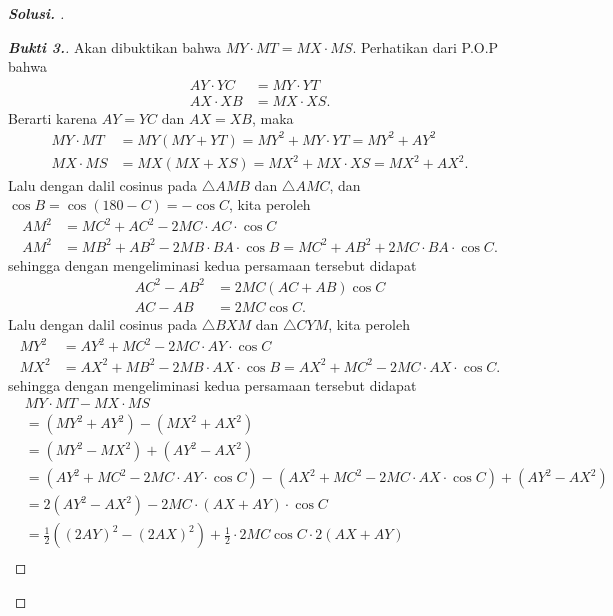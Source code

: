 \begin{proof}[\textbf{Solusi. }]
\begin{proof}[\textbf{Bukti 3.}]
        Akan dibuktikan bahwa $MY \cdot MT = MX \cdot MS$. Perhatikan dari P.O.P bahwa
        \begin{align*}
            AY \cdot YC &= MY \cdot YT\\
            AX \cdot XB &= MX \cdot XS.
        \end{align*}
        Berarti karena $AY=YC$ dan $AX=XB$, maka 
        \begin{align*}
            MY \cdot MT &= MY(MY+YT) = MY^2 + MY \cdot YT = MY^2 + AY^2\\
            MX \cdot MS &= MX(MX+XS) = MX^2 + MX \cdot XS = MX^2 + AX^2.
        \end{align*}
        Lalu dengan dalil cosinus pada $\triangle AMB$ dan $\triangle AMC$, dan $\cos B = \cos(180- C) = -\cos C$, kita peroleh
        \begin{align*}
            AM^2 &= MC^2 + AC^2 - 2MC \cdot AC \cdot \cos C\\
            AM^2 &= MB^2 + AB^2 - 2MB \cdot BA \cdot \cos B = MC^2 + AB^2 + 2MC \cdot BA \cdot \cos C.
        \end{align*}
        sehingga dengan mengeliminasi kedua persamaan tersebut didapat
        \begin{align*}
            AC^2 - AB^2 &= 2MC (AC+AB) \cos C\\
            AC - AB &= 2MC \cos C.
        \end{align*}
        Lalu dengan dalil cosinus pada $\triangle BXM$ dan $\triangle CYM$, kita peroleh
        \begin{align*}
            MY^2 &= AY^2 + MC^2 - 2MC \cdot AY \cdot \cos C\\
            MX^2 &= AX^2 + MB^2 - 2MB \cdot AX \cdot \cos B = AX^2 + MC^2 - 2MC \cdot AX \cdot \cos C.
        \end{align*}
        sehingga dengan mengeliminasi kedua persamaan tersebut didapat
        \begin{align*}
            &MY \cdot MT - MX \cdot MS\\ 
            &= (MY^2 + AY^2) - (MX^2 + AX^2)\\
            &= (MY^2 - MX^2) + (AY^2 - AX^2)\\
            &= (AY^2 + MC^2 - 2MC \cdot AY \cdot \cos C) - (AX^2 + MC^2 - 2MC \cdot AX \cdot \cos C) + (AY^2 - AX^2)\\
            &= 2(AY^2 - AX^2) - 2 MC \cdot (AX+AY) \cdot \cos C\\
            &= \frac12((2AY)^2 - (2AX)^2) + \frac12 \cdot 2 MC \cos C \cdot 2(AX+AY) \\

\end{align*}
\end{proof}
\end{proof}
